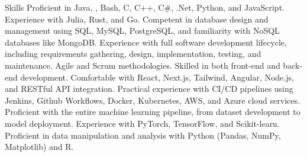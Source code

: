 
\begin{rubric}{Skills}
    Proficient in Java, , Bash, C, C++, C\#, .Net, Python, and JavaScript. Experience with Julia, Rust, and Go.
    Competent in database design and management using SQL, MySQL, PostgreSQL, and familiarity with NoSQL databases like MongoDB.
    Experience with full software development lifecycle, including requirements gathering, design, implementation, testing, and maintenance. Agile and Scrum methodologies.
    Skilled in both front-end and back-end development. Comfortable with React, Next.js, Tailwind, Angular, Node.js, and RESTful API integration.
    Practical experience with CI/CD pipelines using Jenkins, Github Workflows, Docker, Kubernetes, AWS, and Azure cloud services.
    Proficient with the entire machine learning pipeline, from dataset development to model deployment. Experience with PyTorch, TensorFlow, and Scikit-learn.
    Proficient in data manipulation and analysis with Python (Pandas, NumPy, Matplotlib) and R.
\end{rubric}
